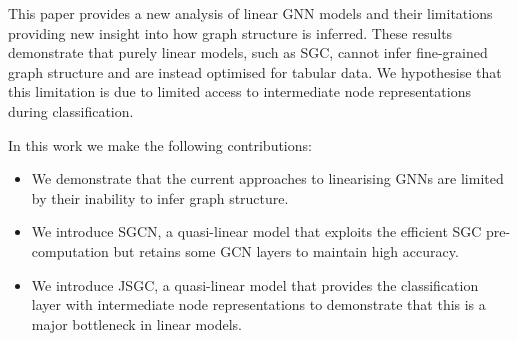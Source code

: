 %



This paper provides a new analysis of linear GNN models and their limitations providing new insight into how graph structure is inferred.
These results demonstrate that purely linear models, such as SGC, cannot infer fine-grained graph structure and are instead optimised for tabular data.
We hypothesise that this limitation is due to limited access to intermediate node representations during classification.

In this work we make the following contributions:
\begin{itemize}
    \item 
        We demonstrate that the current approaches to linearising GNNs are limited by their inability to infer graph structure.
    \item 
        We introduce SGCN, a quasi-linear model that exploits the efficient SGC pre-computation but retains some GCN layers to maintain high accuracy.
    \item
        We introduce JSGC, a quasi-linear model that provides the classification layer with intermediate node representations to demonstrate that this is a major bottleneck in linear models.
\end{itemize}

